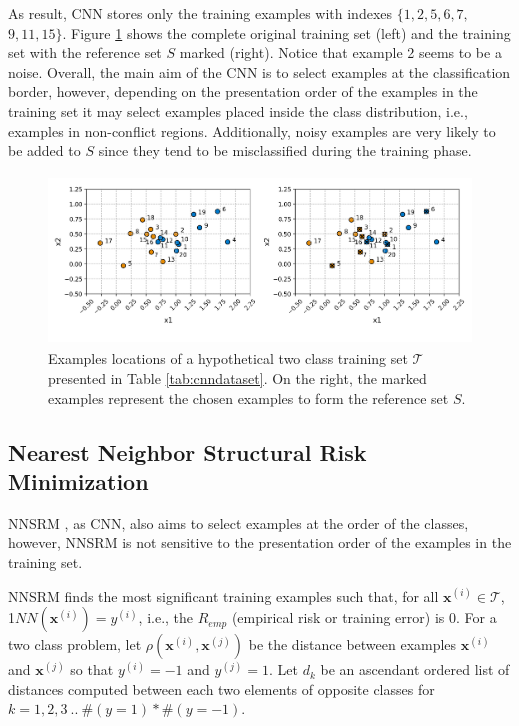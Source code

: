 \vspace{0.4cm}

As result, CNN stores only the training examples with indexes $\{1,2,5,6,7,$ $9,11,15\}$. Figure \ref{fig:cnndataset} shows the complete original training set (left) and the training set with the reference set $S$ marked (right). Notice that example 2 seems to be a noise. Overall, the main aim of the CNN is to select examples at the classification border, however, depending on the presentation order of the examples in the training set it may select examples placed inside the class distribution, i.e., examples in non-conflict regions. Additionally, noisy examples are very likely to be added to $S$ since they tend to be misclassified during the training phase.%

\begin{figure}[h]
    \centering
    \includegraphics[height = 4.5cm, width =  12cm]{"Part 3 - Learning Systems/Supervised Learning/k-Nearest Neighbors/figures/cnndataset.png"}
    \caption{Examples locations of a hypothetical two class training set $\mathcal{T}$ presented in Table \ref{tab:cnndataset}. On the right, the marked examples represent the chosen examples to form the reference set $S$.}
    \label{fig:cnndataset}
\end{figure}

\subsection{Nearest Neighbor Structural Risk Minimization}

NNSRM \cite{nnsrm:2003}, as CNN, also aims to select examples at the order of the classes, however, NNSRM is not sensitive to the presentation order of the examples in the training set. 

NNSRM finds the most significant training examples such that, for all $\mathbf{x}^{(i)} \in \mathcal{T}$, 1$NN(\mathbf{x}^{(i)}) = y^{(i)}$, i.e., the $R_{emp}$ (empirical risk or training error) is 0. For a two class problem, let $\rho(\mathbf{x}^{(i)},\mathbf{x}^{(j)})$ be the distance between examples $\mathbf{x}^{(i)}$ and $\mathbf{x}^{(j)}$ so that $y^{(i)} = -1$ and $y^{(j)} = 1$. Let $d_k$ be an ascendant ordered list of distances computed between each two elements of opposite classes for $k = 1, 2, 3 \: .. \: \#(y=1) * \#(y=-1)$.

